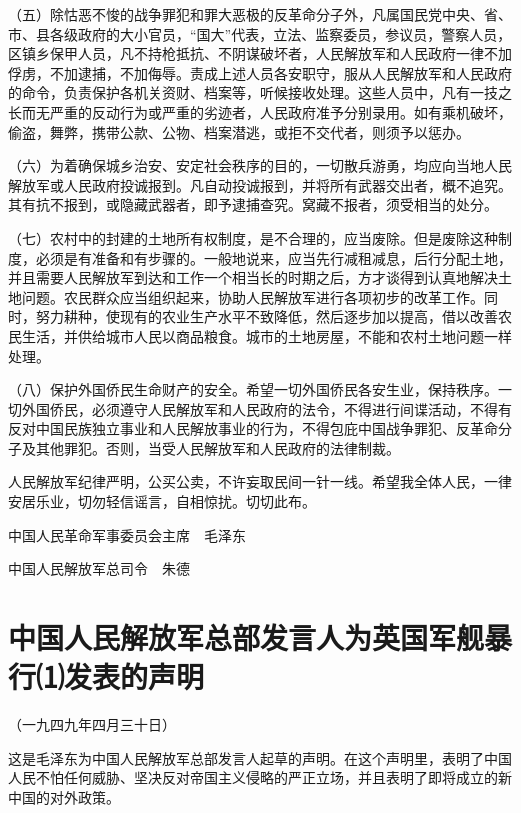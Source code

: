 \documentclass[UTF-8, a5paper, 12pt]{ctexart}
\begin{document}
（五）除怙恶不悛的战争罪犯和罪大恶极的反革命分子外，凡属国民党中央、省、市、县各级政府的大小官员，“国大”代表，立法、监察委员，参议员，警察人员，区镇乡保甲人员，凡不持枪抵抗、不阴谋破坏者，人民解放军和人民政府一律不加俘虏，不加逮捕，不加侮辱。责成上述人员各安职守，服从人民解放军和人民政府的命令，负责保护各机关资财、档案等，听候接收处理。这些人员中，凡有一技之长而无严重的反动行为或严重的劣迹者，人民政府准予分别录用。如有乘机破坏，偷盗，舞弊，携带公款、公物、档案潜逃，或拒不交代者，则须予以惩办。

（六）为着确保城乡治安、安定社会秩序的目的，一切散兵游勇，均应向当地人民解放军或人民政府投诚报到。凡自动投诚报到，并将所有武器交出者，概不追究。其有抗不报到，或隐藏武器者，即予逮捕查究。窝藏不报者，须受相当的处分。

（七）农村中的封建的土地所有权制度，是不合理的，应当废除。但是废除这种制度，必须是有准备和有步骤的。一般地说来，应当先行减租减息，后行分配土地，并且需要人民解放军到达和工作一个相当长的时期之后，方才谈得到认真地解决土地问题。农民群众应当组织起来，协助人民解放军进行各项初步的改革工作。同时，努力耕种，使现有的农业生产水平不致降低，然后逐步加以提高，借以改善农民生活，并供给城市人民以商品粮食。城市的土地房屋，不能和农村土地问题一样处理。

（八）保护外国侨民生命财产的安全。希望一切外国侨民各安生业，保持秩序。一切外国侨民，必须遵守人民解放军和人民政府的法令，不得进行间谍活动，不得有反对中国民族独立事业和人民解放事业的行为，不得包庇中国战争罪犯、反革命分子及其他罪犯。否则，当受人民解放军和人民政府的法律制裁。

人民解放军纪律严明，公买公卖，不许妄取民间一针一线。希望我全体人民，一律安居乐业，切勿轻信谣言，自相惊扰。切切此布。

中国人民革命军事委员会主席　毛泽东

中国人民解放军总司令　朱德

\section{中国人民解放军总部发言人为英国军舰暴行⑴发表的声明}

（一九四九年四月三十日）

这是毛泽东为中国人民解放军总部发言人起草的声明。在这个声明里，表明了中国人民不怕任何威胁、坚决反对帝国主义侵略的严正立场，并且表明了即将成立的新中国的对外政策。
\end{document}
